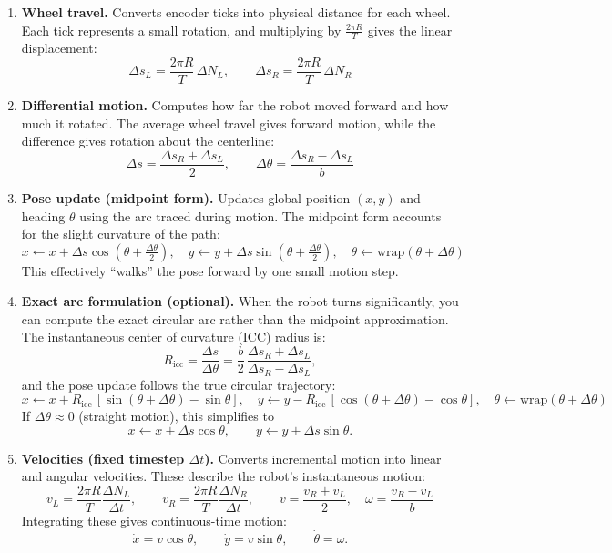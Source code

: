 \documentclass[12pt]{article}
\begin{document}
\begin{enumerate}[label=\textbf{\arabic*.}, leftmargin=*, itemsep=3pt, topsep=2pt]

  \item \textbf{Wheel travel.}  
  Converts encoder ticks into physical distance for each wheel.  
  Each tick represents a small rotation, and multiplying by $\frac{2\pi R}{T}$ gives the linear displacement:
  \[
    \Delta s_L=\frac{2\pi R}{T}\,\Delta N_L,\qquad
    \Delta s_R=\frac{2\pi R}{T}\,\Delta N_R
  \]

  \item \textbf{Differential motion.}  
  Computes how far the robot moved forward and how much it rotated.  
  The average wheel travel gives forward motion, while the difference gives rotation about the centerline:
  \[
    \Delta s=\frac{\Delta s_R+\Delta s_L}{2},\qquad
    \Delta\theta=\frac{\Delta s_R-\Delta s_L}{b}
  \]

  \item \textbf{Pose update (midpoint form).}  
  Updates global position $(x, y)$ and heading $\theta$ using the arc traced during motion.  
  The midpoint form accounts for the slight curvature of the path:
  \[
    x \leftarrow x + \Delta s \cos\!\left(\theta+\tfrac{\Delta\theta}{2}\right),\quad
    y \leftarrow y + \Delta s \sin\!\left(\theta+\tfrac{\Delta\theta}{2}\right),\quad
    \theta \leftarrow \mathrm{wrap}(\theta+\Delta\theta)
  \]
  This effectively “walks” the pose forward by one small motion step.

  \item \textbf{Exact arc formulation (optional).}  
  When the robot turns significantly, you can compute the exact circular arc rather than the midpoint approximation.  
  The instantaneous center of curvature (ICC) radius is:
  \[
    R_{\mathrm{icc}}=\frac{\Delta s}{\Delta\theta}
    =\frac{b}{2}\,\frac{\Delta s_R+\Delta s_L}{\Delta s_R-\Delta s_L},
  \]
  and the pose update follows the true circular trajectory:
  \[
    x \leftarrow x + R_{\mathrm{icc}}\,[\sin(\theta+\Delta\theta)-\sin\theta],\quad
    y \leftarrow y - R_{\mathrm{icc}}\,[\cos(\theta+\Delta\theta)-\cos\theta],\quad
    \theta \leftarrow \mathrm{wrap}(\theta+\Delta\theta)
  \]
  If $\Delta\theta\approx 0$ (straight motion), this simplifies to
  \[
    x \leftarrow x+\Delta s\cos\theta,\qquad
    y \leftarrow y+\Delta s\sin\theta.
  \]

  \item \textbf{Velocities (fixed timestep $\Delta t$).}  
  Converts incremental motion into linear and angular velocities.  
  These describe the robot’s instantaneous motion:
  \[
    v_L=\frac{2\pi R}{T}\frac{\Delta N_L}{\Delta t},\qquad
    v_R=\frac{2\pi R}{T}\frac{\Delta N_R}{\Delta t},\qquad
    v=\frac{v_R+v_L}{2},\quad
    \omega=\frac{v_R-v_L}{b}
  \]
  Integrating these gives continuous-time motion:
  \[
    \dot x=v\cos\theta,\qquad
    \dot y=v\sin\theta,\qquad
    \dot\theta=\omega.
  \]

\end{enumerate}
\end{document}
